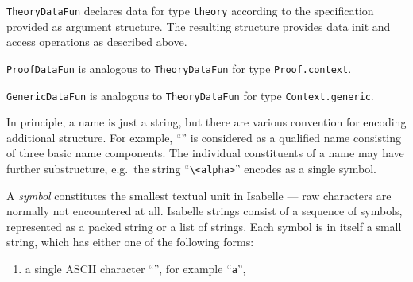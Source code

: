 \begin{isabellebody}
\begin{isamarkuptext}
  \begin{description}

  \item \verb|TheoryDataFun| declares data for
  type \verb|theory| according to the specification provided as
  argument structure.  The resulting structure provides data init and
  access operations as described above.

  \item \verb|ProofDataFun| is analogous to
  \verb|TheoryDataFun| for type \verb|Proof.context|.

  \item \verb|GenericDataFun| is analogous to
  \verb|TheoryDataFun| for type \verb|Context.generic|.

  \end{description}%
\end{isamarkuptext}%
\isamarkuptrue%
%
\endisatagmlref
{\isafoldmlref}%
%
\isadelimmlref
%
\endisadelimmlref
%
\isamarkuptrue%
%
\begin{isamarkuptext}%
In principle, a name is just a string, but there are various
  convention for encoding additional structure.  For example, ``'' is considered as a qualified name consisting of
  three basic name components.  The individual constituents of a name
  may have further substructure, e.g.\ the string
  ``\verb,\,\verb,<alpha>,'' encodes as a single symbol.%
\end{isamarkuptext}%
\isamarkuptrue%
%
\isamarkuptrue%
%
\begin{isamarkuptext}%

  A \emph{symbol} constitutes the smallest textual unit in Isabelle
  --- raw characters are normally not encountered at all.  Isabelle
  strings consist of a sequence of symbols, represented as a packed
  string or a list of strings.  Each symbol is in itself a small
  string, which has either one of the following forms:

  \begin{enumerate}

  \item a single ASCII character ``'', for example
  ``\verb,a,'',


\end{enumerate}
\end{isamarkuptext}
\end{isabellebody}
